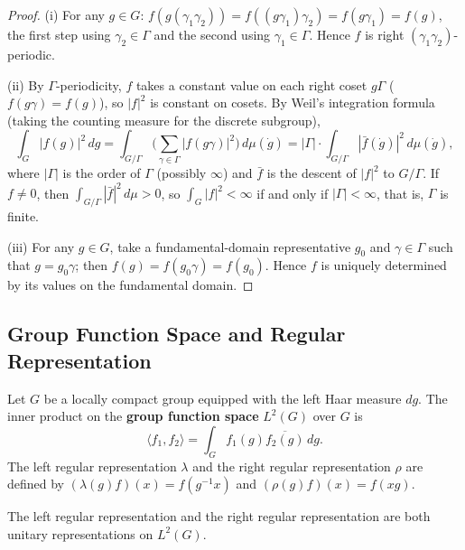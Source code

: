 \begin{proof}
(i) For any $g\in G$: $f(g(\gamma_1\gamma_2))=f((g\gamma_1)\gamma_2)=f(g\gamma_1)=f(g)$, the first step using $\gamma_2\in\Gamma$ and the second using $\gamma_1\in\Gamma$. Hence $f$ is right $(\gamma_1\gamma_2)$-periodic.

(ii) By $\Gamma$-periodicity, $f$ takes a constant value on each right coset $g\Gamma$ ($f(g\gamma)=f(g)$), so $|f|^2$ is constant on cosets. By Weil's integration formula (taking the counting measure for the discrete subgroup),
\[
\int_G |f(g)|^2\,dg = \int_{G/\Gamma}\Big(\sum_{\gamma\in\Gamma}|f(g\gamma)|^2\Big)\,d\mu(\dot g) = |\Gamma|\cdot\int_{G/\Gamma}|\bar f(\dot g)|^2\,d\mu(\dot g),
\]
where $|\Gamma|$ is the order of $\Gamma$ (possibly $\infty$) and $\bar f$ is the descent of $|f|^2$ to $G/\Gamma$. If $f\neq 0$, then $\int_{G/\Gamma}|\bar f|^2\,d\mu>0$, so $\int_G|f|^2<\infty$ if and only if $|\Gamma|<\infty$, that is, $\Gamma$ is finite.

(iii) For any $g\in G$, take a fundamental-domain representative $g_0$ and $\gamma\in\Gamma$ such that $g=g_0\gamma$; then $f(g)=f(g_0\gamma)=f(g_0)$. Hence $f$ is uniquely determined by its values on the fundamental domain.
\end{proof}

\subsection{Group Function Space and Regular Representation}

\begin{definition}\label{def:group_function_space}
Let $G$ be a locally compact group equipped with the left Haar measure $dg$. The inner product on the \textbf{group function space} $L^2(G)$ over $G$ is
\[
\langle f_1, f_2 \rangle = \int_G f_1(g) \overline{f_2(g)} \, dg.
\]
The left regular representation $\lambda$ and the right regular representation $\rho$ are defined by $(\lambda(g) f)(x) = f(g^{-1} x)$ and $(\rho(g) f)(x) = f(xg)$.
\end{definition}

\begin{proposition}\label{prop:regular_unitary}
The left regular representation and the right regular representation are both unitary representations on $L^2(G)$.
\end{proposition}

